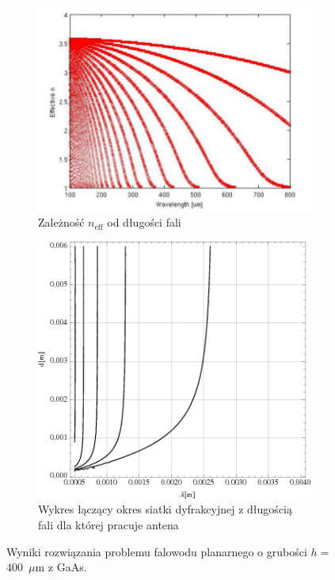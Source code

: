 \begin{figure}
\begin{subfigure}{0.5\textwidth}
        \includegraphics[width=\textwidth]{pomocnicze/thz/gaas-neffeps.png}
	\caption{Zależność $n_{\textrm{eff}}$ od długości fali}
	\label{fig:gaas-effn}
\end{subfigure}
\begin{subfigure}{0.5\textwidth}
        \includegraphics[width=\textwidth]{images/antenaThz/d_lambda.png}
	\caption{Wykres łączący okres siatki dyfrakcyjnej z długością fali dla której pracuje antena}
	\label{fig:d-lusok}
\end{subfigure}
\caption{Wyniki rozwiązania problemu falowodu planarnego o grubości $h=$400~$\mu$m z GaAs.}
\end{figure}



